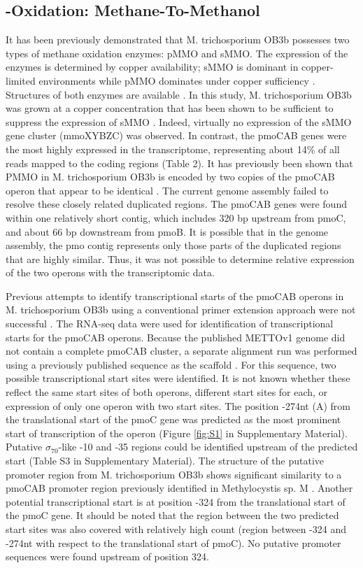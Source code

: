 \subsection{-Oxidation: Methane-To-Methanol}
It has been previously demonstrated that M. trichosporium OB3b possesses two types of methane oxidation enzymes: pMMO and sMMO.
The expression of the enzymes is determined by copper availability; sMMO is dominant in copper-limited environments while pMMO dominates under copper sufficiency \cite{hakemian2007, semrau2010}.
Structures of both enzymes are available \cite{elango1997, hakemian2008}.
In this study, M. trichosporium OB3b was grown at a copper concentration that has been shown to be sufficient to suppress the expression of sMMO \cite{park1991, phelps1992, nielsen1997, lloyd1999, murrell2000}.
Indeed, virtually no expression of the sMMO gene cluster (mmoXYBZC) was observed.
In contrast, the pmoCAB genes were the most highly expressed in the transcriptome, representing about 14\% of all reads mapped to the coding regions (Table 2).
It has previously been shown that PMMO in M. trichosporium OB3b is encoded by two copies of the pmoCAB operon that appear to be identical \cite{gilbert2000}.
The current genome assembly failed to resolve these closely related duplicated regions.
The pmoCAB genes were found within one relatively short contig, which includes 320 bp upstream from pmoC, and about 66 bp downstream from pmoB.
It is possible that in the genome assembly, the pmo contig represents only those parts of the duplicated regions that are highly similar.
Thus, it was not possible to determine relative expression of the two operons with the transcriptomic data.

Previous attempts to identify transcriptional starts of the pmoCAB operons in M. trichosporium OB3b using a conventional primer extension approach were not successful \cite{gilbert2000}.
The RNA-seq data were used for identification of transcriptional starts for the pmoCAB operons.
Because the published METTOv1 genome did not contain a complete pmoCAB cluster, a separate alignment run was performed using a previously published sequence as the scaffold \cite{holmes1995}.
For this sequence, two possible transcriptional start sites were identified.
It is not known whether these reflect the same start sites of both operons, different start sites for each, or expression of only one operon with two start sites.
The position -274nt (A) from the translational start of the pmoC gene was predicted as the most prominent start of transcription of the operon (Figure \ref{fig:S1} in Supplementary Material).
Putative $\sigma_{70}$-like -10 and -35 regions could be identified upstream of the predicted start (Table S3 in Supplementary Material).
The structure of the putative promoter region from M. trichosporium OB3b shows significant similarity to a pmoCAB promoter region previously identified in Methylocystis sp. M \cite{gilbert2000}.
Another potential transcriptional start is at position -324 from the translational start of the pmoC gene.
It should be noted that the region between the two predicted start sites was also covered with relatively high count (region between -324 and -274nt with respect to the translational start of pmoC).
No putative promoter sequences were found upstream of position 324.

